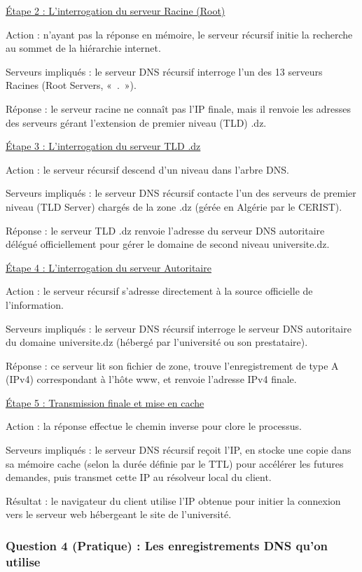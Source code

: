 \documentclass[12pt,a4paper]{article}
\begin{document}
\underline{Étape 2 : L'interrogation du serveur Racine (Root)}

Action : n'ayant pas la réponse en mémoire, le serveur récursif initie
la recherche au sommet de la hiérarchie internet.

Serveurs impliqués : le serveur DNS récursif interroge l'un des 13
serveurs Racines (Root Servers, «~.~»).

Réponse : le serveur racine ne connaît pas l'IP finale, mais il renvoie
les adresses des serveurs gérant l'extension de premier niveau (TLD)
.dz.

\underline{Étape 3 : L'interrogation du serveur TLD .dz}

Action : le serveur récursif descend d'un niveau dans l'arbre DNS.

Serveurs impliqués : le serveur DNS récursif contacte l'un des serveurs
de premier niveau (TLD Server) chargés de la zone .dz (gérée en Algérie
par le CERIST).

Réponse : le serveur TLD .dz renvoie l'adresse du serveur DNS
autoritaire délégué officiellement pour gérer le domaine de second
niveau universite.dz.

\underline{Étape 4 : L'interrogation du serveur Autoritaire}

Action : le serveur récursif s'adresse directement à la source
officielle de l'information.

Serveurs impliqués : le serveur DNS récursif interroge le serveur DNS
autoritaire du domaine universite.dz (hébergé par l'université ou son
prestataire).

Réponse : ce serveur lit son fichier de zone, trouve l'enregistrement
de type A (IPv4) correspondant à l'hôte www, et renvoie l'adresse IPv4
finale.

\underline{Étape 5 : Transmission finale et mise en cache}

Action : la réponse effectue le chemin inverse pour clore le processus.

Serveurs impliqués : le serveur DNS récursif reçoit l'IP, en stocke une
copie dans sa mémoire cache (selon la durée définie par le TTL) pour
accélérer les futures demandes, puis transmet cette IP au résolveur
local du client.

Résultat : le navigateur du client utilise l'IP obtenue pour initier la
connexion vers le serveur web hébergeant le site de l'université.

\subsubsection*{Question 4 (Pratique) : Les enregistrements DNS qu'on utilise}
\end{document}
